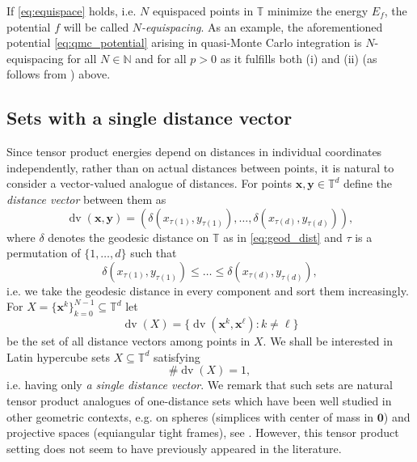 \documentclass[a4paper,12pt]{article}
\numberwithin{equation}{section}
\theoremstyle{definition}
\newtheorem{defi}[thm]{Definition}
\newcommand{\bx}{\mathbf{x}}
\newcommand{\by}{\mathbf{y}}
\newcommand{\bbN}{\mathbb{N}}
\newcommand{\bbT}{\mathbb{T}}
\newcommand{\sbse}{\subseteq}
\newcommand{\dv}{\operatorname{dv}}
\begin{document}


If  \eqref{eq:equispace} holds, i.e.  $N$ equispaced points in $\bbT$ minimize the energy $E_f$, the potential $f$ will be called \emph{$N$-equispacing}. As an example, the aforementioned potential \eqref{eq:qmc_potential} arising in quasi-Monte Carlo integration is $N$-equispacing for all $N \in \bbN$ and for all $p > 0$ as it fulfills both (i) and (ii) (as follows from \cite[equation (13)]{Leh85}) above.











\subsection{Sets with a single distance vector}

Since tensor product energies depend on distances in individual coordinates independently, rather than on actual distances between points, it is natural to consider a vector-valued analogue of distances.   For points $\bx, \by \in \bbT^d$ define the \emph{distance vector} between them as %
$$
\dv(\bx, \by) = (\delta(x_{\tau(1)}, y_{\tau(1)}), \dots, \delta(x_{\tau(d)}, y_{\tau(d)})),
$$
where $\delta$ denotes the geodesic distance on $\mathbb T$ as in \eqref{eq:geod_dist} and $\tau$ is a permutation of $\{1, \dots, d\}$ such that
$$
\delta(x_{\tau(1)}, y_{\tau(1)}) \leq \dots \leq \delta(x_{\tau(d)}, y_{\tau(d)}),
$$
i.e. we take the geodesic distance in every component and sort them increasingly. For $X = \{\bx^k\}_{k=0}^{N-1} \sbse \bbT^d$ let
$$
\dv(X) = \{\dv(\bx^k, \bx^\ell): k \neq \ell\}
$$
be the set of all distance vectors among points in $X$. We shall be interested in  Latin hypercube sets $X \sbse \bbT^d$ satisfying
$$
\#\dv(X) = 1,
$$
i.e. having only {\emph{a single distance vector}}.  We remark that such sets are natural tensor product analogues  of one-distance sets which have been well studied in  other geometric contexts, e.g. on spheres (simplices with center of mass in $\mathbf 0$) and projective spaces (equiangular tight frames), see \cite{CKM16}. However, this tensor product setting does not seem to have previously  appeared in the literature. 
\end{document}
